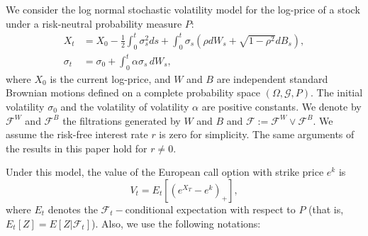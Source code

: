 \documentclass[11pt]{article}
\begin{document}
We consider the log normal stochastic volatility model for the log-price of a stock
under a risk-neutral probability measure $P$:
\begin{align}
\label{themodel}
X_{t} &=X_0-\frac{1}{2}\int_{0}^{t}{\sigma _{s}^{2}}ds+\int_{0}^{t}\sigma
_{s}\left( \rho dW_{s}+\sqrt{1-\rho ^{2}}dB_{s}\right), \\
\label{SABR}
\sigma_t &= \sigma_0 + \int_0^t \alpha \sigma_s \, dW_s,
\end{align}
where $X_0$ is the current log-price, and $W$ and $B$ are independent standard Brownian motions defined on a complete probability
space  $(\Omega ,\mathcal{G},P)$.  The initial volatility $\sigma_0$ and the volatility of volatility $\alpha$ are  positive constants. We denote by $\mathcal{F}^{W}$ and $\mathcal{F}^{B}$
the filtrations generated by $W$ and $B$ and $\mathcal{F}:=%
\mathcal{F}^{W}\vee \mathcal{F}^{B}.$ We assume the risk-free interest rate $r$ is zero for simplicity. The same arguments of the results in this paper hold for $r\neq 0$.

Under this model, the value of the European call option with strike price $e^k$ is
\[
V_{t}=E_{t}[(e^{X_{T}}-e^k)_{+}], 
\]%
where $E_{t}$ denotes the $\mathcal{F}_{t}-$conditional expectation with respect
to $P$ (that is, $E_{t}[Z]=E[Z|\mathcal{F}_{t}]$). 
Also, we use the following notations:
\end{document}
